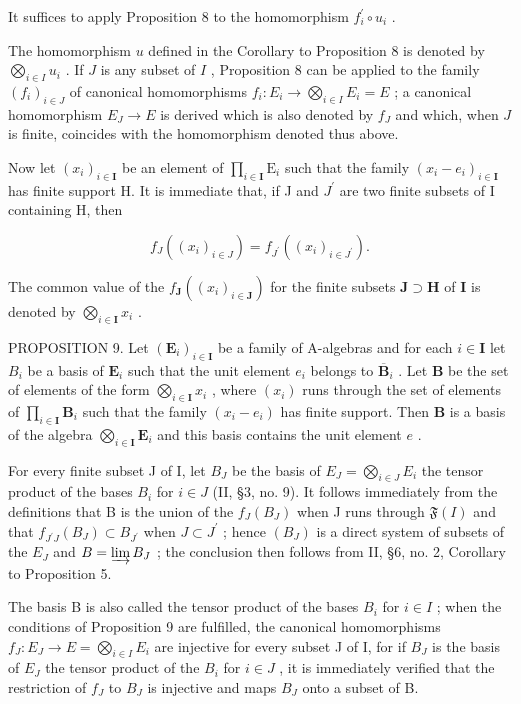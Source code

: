 It suffices to apply Proposition 8 to the homomorphism \(f_{i}^{\prime} \circ u_{i}\) .

The homomorphism \(u\) defined in the Corollary to Proposition 8 is denoted by \(\bigotimes_{i \in I} u_i\) . If \(J\) is any subset of \(I\) , Proposition 8 can be applied to the family \((f_i)_{i \in J}\) of canonical homomorphisms \(f_i: E_i \to \bigotimes_{i \in I} E_i = E\) ; a canonical homomorphism \(E_J \to E\) is derived which is also denoted by \(f_J\) and which, when \(J\) is finite, coincides with the homomorphism denoted thus above.

Now let \((x_{i})_{i\in \mathbf{I}}\) be an element of \(\prod_{i\in \mathbf{I}}\mathrm{E}_i\) such that the family \((x_{i} - e_{i})_{i\in \mathbf{I}}\) has finite support H. It is immediate that, if J and \(J^{\prime}\) are two finite subsets of I containing H, then

\[
f _ {J} ((x _ {i}) _ {i \in J}) = f _ {J ^ {\prime}} ((x _ {i}) _ {i \in J ^ {\prime}}).
\]

The common value of the \(f_{\mathbf{J}}((x_i)_{i \in \mathbf{J}})\) for the finite subsets \(\mathbf{J} \supset \mathbf{H}\) of \(\mathbf{I}\) is denoted by \(\bigotimes_{i \in \mathbf{I}} x_i\) .

PROPOSITION 9. Let \((\mathbf{E}_i)_{i\in \mathbf{I}}\) be a family of A-algebras and for each \(i\in \mathbf{I}\) let \(B_{i}\) be a basis of \(\mathbf{E}_i\) such that the unit element \(e_i\) belongs to \(\overline{\mathbf{B}}_i\) . Let \(\mathbf{B}\) be the set of elements of the form \(\bigotimes_{i\in \mathbf{I}}x_i\) , where \((x_{i})\) runs through the set of elements of \(\prod_{i\in \mathbf{I}}\mathbf{B}_i\) such that the family \((x_{i} - e_{i})\) has finite support. Then \(\mathbf{B}\) is a basis of the algebra \(\bigotimes_{i\in \mathbf{I}}\mathbf{E}_i\) and this basis contains the unit element \(e\) .

For every finite subset J of I, let \(B_{J}\) be the basis of \(E_{J} = \bigotimes_{i \in J} E_{i}\) the tensor product of the bases \(B_{i}\) for \(i \in J\) (II, §3, no. 9). It follows immediately from the definitions that B is the union of the \(f_{J}(B_{J})\) when J runs through \(\mathfrak{F}(I)\) and that \(f_{J^{\prime}J}(B_{J}) \subset B_{J^{\prime}}\) when \(J \subset J^{\prime}\) ; hence \((B_{J})\) is a direct system of subsets of the \(E_{J}\) and \(B = \varinjlim B_{J}\) ; the conclusion then follows from II, §6, no. 2, Corollary to Proposition 5.

The basis B is also called the tensor product of the bases \(B_{i}\) for \(i \in I\) ; when the conditions of Proposition 9 are fulfilled, the canonical homomorphisms \(f_{J}: E_{J} \to E = \bigotimes_{i \in I} E_{i}\) are injective for every subset J of I, for if \(B_{J}\) is the basis of \(E_{J}\) the tensor product of the \(B_{i}\) for \(i \in J\) , it is immediately verified that the restriction of \(f_{J}\) to \(B_{J}\) is injective and maps \(B_{J}\) onto a subset of B.

